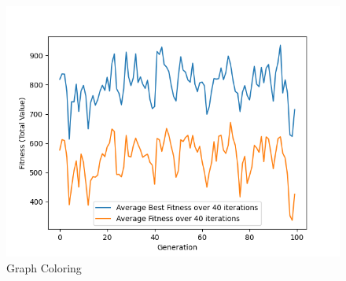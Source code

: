 \documentclass[11pt, letterpaper]{article}
\begin{document}
\begin{figure}[H]
  \includegraphics[width=\linewidth]{images/knapsack_rd_rd.png}
  \caption{Graph Coloring}
\endminipage
\end{figure}
\end{document}
